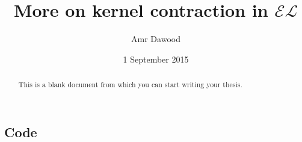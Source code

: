 \documentclass{sfuthesis}
\title{More on kernel contraction in $\mathcal{EL}$}
\author{Amr Dawood}
\date{1 September 2015}
\theoremstyle{plain}
\theoremstyle{definition}
\begin{document}
\frontmatter
\maketitle{}
\makecommittee{}

\begin{abstract}
	This is a blank document from which you can start writing your thesis.
\end{abstract}


\begin{dedication} %
\end{dedication}


\begin{acknowledgements} %
\end{acknowledgements}

\tableofcontents\clearpage
{}\listoftables\clearpage
{}\listoffigures





%
%

\mainmatter%




















%
%
%
%
%

\backmatter%
	
	

\begin{appendices} %
	\chapter{Code}
\end{appendices}
\end{document}
